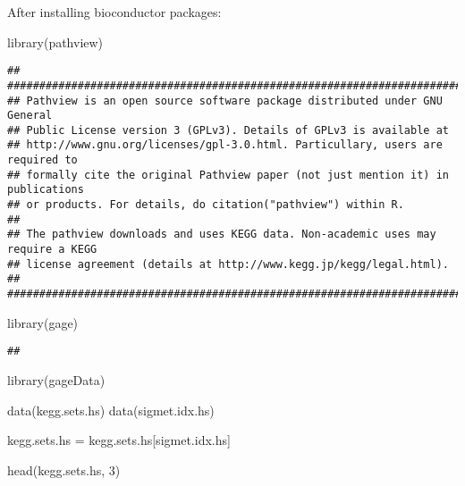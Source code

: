 \documentclass[
]{article}
\newenvironment{Shaded}{\begin{snugshade}}{\end{snugshade}}
\newcommand{\DecValTok}[1]{\textcolor[rgb]{0.00,0.00,0.81}{#1}}
\newcommand{\FunctionTok}[1]{\textcolor[rgb]{0.00,0.00,0.00}{#1}}
\newcommand{\NormalTok}[1]{#1}
\newcommand{\OtherTok}[1]{\textcolor[rgb]{0.56,0.35,0.01}{#1}}
\begin{document}
After installing bioconductor packages:

\begin{Shaded}
\begin{Highlighting}[]
\FunctionTok{library}\NormalTok{(pathview)}
\end{Highlighting}
\end{Shaded}

\begin{verbatim}
## ##############################################################################
## Pathview is an open source software package distributed under GNU General
## Public License version 3 (GPLv3). Details of GPLv3 is available at
## http://www.gnu.org/licenses/gpl-3.0.html. Particullary, users are required to
## formally cite the original Pathview paper (not just mention it) in publications
## or products. For details, do citation("pathview") within R.
## 
## The pathview downloads and uses KEGG data. Non-academic uses may require a KEGG
## license agreement (details at http://www.kegg.jp/kegg/legal.html).
## ##############################################################################
\end{verbatim}

\begin{Shaded}
\begin{Highlighting}[]
\FunctionTok{library}\NormalTok{(gage)}
\end{Highlighting}
\end{Shaded}

\begin{verbatim}
## 
\end{verbatim}

\begin{Shaded}
\begin{Highlighting}[]
\FunctionTok{library}\NormalTok{(gageData)}

\FunctionTok{data}\NormalTok{(kegg.sets.hs)}
\FunctionTok{data}\NormalTok{(sigmet.idx.hs)}

\NormalTok{kegg.sets.hs }\OtherTok{=}\NormalTok{ kegg.sets.hs[sigmet.idx.hs]}

\FunctionTok{head}\NormalTok{(kegg.sets.hs, }\DecValTok{3}\NormalTok{)}
\end{Highlighting}
\end{Shaded}
\end{document}
